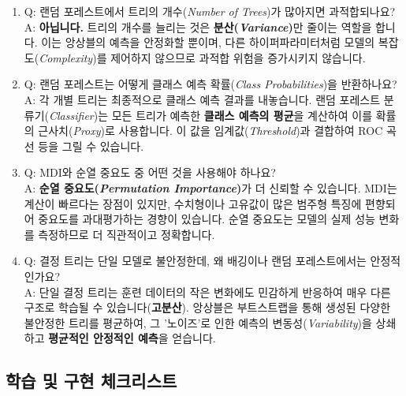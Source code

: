 \documentclass[11pt,a4paper]{book}
\theoremstyle{definition}
\begin{document}
\begin{enumerate}
    \item Q: 랜덤 포레스트에서 트리의 개수(\emph{Number of Trees})가 많아지면 과적합되나요?
    \\
    A: \textbf{아닙니다.} 트리의 개수를 늘리는 것은 \textbf{분산(\emph{Variance})}만 줄이는 역할을 합니다. 이는 앙상블의 예측을 안정화할 뿐이며, 다른 하이퍼파라미터처럼 모델의 복잡도(\emph{Complexity})를 제어하지 않으므로 과적합 위험을 증가시키지 않습니다.

    \item Q: 랜덤 포레스트는 어떻게 클래스 예측 확률(\emph{Class Probabilities})을 반환하나요?
    \\
    A: 각 개별 트리는 최종적으로 클래스 예측 결과를 내놓습니다. 랜덤 포레스트 분류기(\emph{Classifier})는 모든 트리가 예측한 \textbf{클래스 예측의 평균}을 계산하여 이를 확률의 근사치(\emph{Proxy})로 사용합니다. 이 값을 임계값(\emph{Threshold})과 결합하여 ROC 곡선 등을 그릴 수 있습니다.

    \item Q: MDI와 순열 중요도 중 어떤 것을 사용해야 하나요?
    \\
    A: \textbf{순열 중요도(\emph{Permutation Importance})}가 더 신뢰할 수 있습니다. MDI는 계산이 빠르다는 장점이 있지만, 수치형이나 고유값이 많은 범주형 특징에 편향되어 중요도를 과대평가하는 경향이 있습니다. 순열 중요도는 모델의 실제 성능 변화를 측정하므로 더 직관적이고 정확합니다.

    \item Q: 결정 트리는 단일 모델로 불안정한데, 왜 배깅이나 랜덤 포레스트에서는 안정적인가요?
    \\
    A: 단일 결정 트리는 훈련 데이터의 작은 변화에도 민감하게 반응하여 매우 다른 구조로 학습될 수 있습니다(\textbf{고분산}). 앙상블은 부트스트랩을 통해 생성된 다양한 불안정한 트리를 평균하여, 그 '노이즈'로 인한 예측의 변동성(\emph{Variability})을 상쇄하고 \textbf{평균적인 안정적인 예측}을 얻습니다.
\end{enumerate}

\subsection{학습 및 구현 체크리스트}
\end{document}
